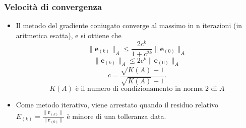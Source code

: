 \documentclass[10pt]{beamer}
\begin{document}
\begin{frame}
\frametitle{Velocità di convergenza}
\begin{itemize}
    \item Il metodo del gradiente coniugato converge al massimo in $\mathrm{n}$ iterazioni (in aritmetica esatta), e si ottiene che $$\|\mathbf{e}_{(k)}\|_A\leq\frac{2c^k}{1+c^{2k}}\|\mathbf{e}_{(0)}\|_A$$
    $$\|\mathbf{e}_{(k)}\|_A\leq2c^k\|\mathbf{e}_{(0)}\|_A$$
    $$ c=\frac{\sqrt{K(A)}-1}{\sqrt{K(A)}+1}.$$
    $$K(A)\text{ è il numero di condizionamento in norma 2 di } A$$
    
    \item Come metodo iterativo, viene arrestato quando il residuo relativo $E_{(k)}=\frac{\|\mathbf{r}_{(k)}\|}{\|\mathbf{r}_{(0)}\|}$ è minore di una tolleranza data. 
\end{itemize}
\end{frame}


    
\end{document}
